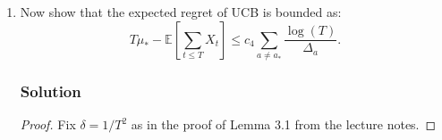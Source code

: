 \begin{enumerate}
  \begin{proof}
    Equation \ref{eqn:1_2_result} follows from Equation \ref{eqn:1_N_at_bound},
    noting that $\sum_{a = 1}^K N_{a,T} = T$, and seeing that
    $\Delta_{a_*} = \mu_* - \mu_{a_*} = 0$

    We have that
    \begin{align*}
      T\mu_* - \sum_{t \leq T} \mu_{a_t}
      &= \sum_{a = 1}^K N_{a,T}\left(\mu_* - \mu_a\right)
p      \\
      &= \sum_{a = 1}^K \Delta_{a}N_{a,T} \\
      &= \sum_{a \neq a_*} \Delta_{a}N_{a,T} \\
      &\leq \sum_{a \neq a_*} \Delta_{a}\left(c_3\frac{\log\left(T/\delta\right)}{\Delta_{a}^2}\right) \\
      &= \sum_{a \neq a_*} c_3\frac{\log\left(T/\delta\right)}{\Delta_{a}},
    \end{align*}
    which gives Equation \ref{eqn:1_2_result} with probability $1 - \delta$ as
    desired.
  \end{proof}
\item Now show that the expected regret of UCB is bounded as:
  \begin{equation}
    T\mu_* - \mathbb{E}\left[\sum_{t \leq T} X_t\right] \leq
    c_4 \sum_{a \neq a_*} \frac{\log\left(T\right)}{\Delta_a}.
    \label{eqn:1_3_result}
  \end{equation}
  \subsubsection*{Solution}
  \begin{proof}
    Fix $\delta = 1/T^2$ as in the proof of Lemma 3.1 from the lecture notes.
    

\end{proof}
\end{enumerate}
